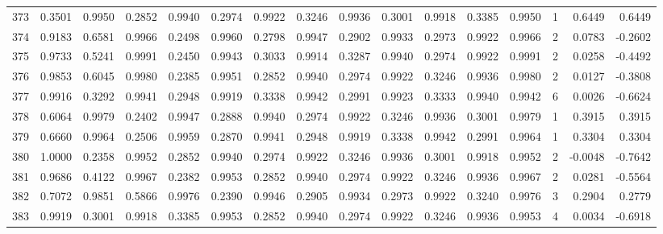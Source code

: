 \begin{tabular}{lrrrrrrrrrrrrrrr}
373 &      0.3501 &  0.9950 &  0.2852 &  0.9940 &  0.2974 &  0.9922 &  0.3246 &  0.9936 &  0.3001 &  0.9918 &   0.3385 &     0.9950 &      1 &                    0.6449 &                     0.6449 \\
374 &      0.9183 &  0.6581 &  0.9966 &  0.2498 &  0.9960 &  0.2798 &  0.9947 &  0.2902 &  0.9933 &  0.2973 &   0.9922 &     0.9966 &      2 &                    0.0783 &                    -0.2602 \\
375 &      0.9733 &  0.5241 &  0.9991 &  0.2450 &  0.9943 &  0.3033 &  0.9914 &  0.3287 &  0.9940 &  0.2974 &   0.9922 &     0.9991 &      2 &                    0.0258 &                    -0.4492 \\
376 &      0.9853 &  0.6045 &  0.9980 &  0.2385 &  0.9951 &  0.2852 &  0.9940 &  0.2974 &  0.9922 &  0.3246 &   0.9936 &     0.9980 &      2 &                    0.0127 &                    -0.3808 \\
377 &      0.9916 &  0.3292 &  0.9941 &  0.2948 &  0.9919 &  0.3338 &  0.9942 &  0.2991 &  0.9923 &  0.3333 &   0.9940 &     0.9942 &      6 &                    0.0026 &                    -0.6624 \\
378 &      0.6064 &  0.9979 &  0.2402 &  0.9947 &  0.2888 &  0.9940 &  0.2974 &  0.9922 &  0.3246 &  0.9936 &   0.3001 &     0.9979 &      1 &                    0.3915 &                     0.3915 \\
379 &      0.6660 &  0.9964 &  0.2506 &  0.9959 &  0.2870 &  0.9941 &  0.2948 &  0.9919 &  0.3338 &  0.9942 &   0.2991 &     0.9964 &      1 &                    0.3304 &                     0.3304 \\
380 &      1.0000 &  0.2358 &  0.9952 &  0.2852 &  0.9940 &  0.2974 &  0.9922 &  0.3246 &  0.9936 &  0.3001 &   0.9918 &     0.9952 &      2 &                   -0.0048 &                    -0.7642 \\
381 &      0.9686 &  0.4122 &  0.9967 &  0.2382 &  0.9953 &  0.2852 &  0.9940 &  0.2974 &  0.9922 &  0.3246 &   0.9936 &     0.9967 &      2 &                    0.0281 &                    -0.5564 \\
382 &      0.7072 &  0.9851 &  0.5866 &  0.9976 &  0.2390 &  0.9946 &  0.2905 &  0.9934 &  0.2973 &  0.9922 &   0.3240 &     0.9976 &      3 &                    0.2904 &                     0.2779 \\
383 &      0.9919 &  0.3001 &  0.9918 &  0.3385 &  0.9953 &  0.2852 &  0.9940 &  0.2974 &  0.9922 &  0.3246 &   0.9936 &     0.9953 &      4 &                    0.0034 &                    -0.6918 \\

\end{tabular}
